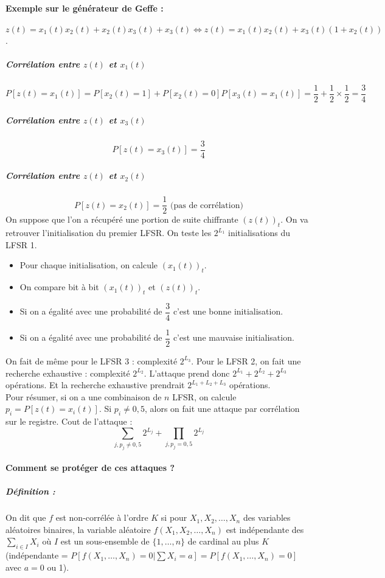 \documentclass[12pt,a4paper]{report}
\begin{document}
\paragraph{Exemple sur le générateur de Geffe :\\}
$z(t) = x_1(t)x_2(t) +x_2(t) x_3(t) + x_3(t) \Leftrightarrow z(t) = x_1(t) x_2(t) +x_3(t)(1+x_2(t))$.
\subparagraph{Corrélation entre $z(t)$ et $x_1(t)$\\}
 $$P[z(t) = x_1(t)]  =  P[x_2(t)=1] + P[x_2(t)=  0]P[x_3(t) = x_1(t)]
                 = \dfrac{1}{2} + \dfrac{1}{2}\times\dfrac{1}{2} 
                 =  \dfrac{3}{4} $$
\subparagraph{Corrélation entre $z(t)$ et $x_3(t)$\\}
$$ P[z(t) = x_3(t)] = \frac{3}{4} $$
\subparagraph{Corrélation entre $z(t)$ et $x_2(t)$\\}
$$ P[z(t) = x_2(t)] = \frac{1}{2} \mbox{ (pas de corrélation)} $$
On suppose que l'on a récupéré une portion de suite chiffrante $(z(t))_t$. On va retrouver l'initialisation du premier LFSR. On teste les $2^{L_1}$ initialisations du LFSR 1.
\begin{itemize}
\item Pour chaque initialisation, on calcule $(x_1(t))_t$.
\item On compare bit à bit $(x_1(t))_t$ et $(z(t))_t$.
\item Si on a égalité avec une probabilité de $\dfrac{3}{4}$ c'est une bonne initialisation.
\item Si on a égalité avec une probabilité de $\dfrac{1}{2}$ c'est une mauvaise initialisation.
\end{itemize}
On fait de même pour le LFSR 3 : complexité $2^{L_3}$. Pour le LFSR 2, on fait une recherche exhaustive : complexité $2^{L_2}$. L'attaque prend donc $2^{L_1}  + 2^{L_2} + 2^{L_3}$ opérations. Et la recherche exhaustive prendrait $2^{L_1+L_2+L_3}$ opérations.\\

Pour résumer, si on a une combinaison de $n$ LFSR, on calcule $p_i = P[z(t) = x_i(t)]$. Si $p_i \neq 0,5$, alors on fait une attaque par corrélation sur le registre. Cout de l'attaque :
$$ \sum_{j,p_j\neq 0,5} 2^{L_j} + \prod_{j,p_j = 0,5}  2^{L_j} $$
\paragraph{Comment se protéger de ces attaques ?}
\subparagraph{Définition :\\}
On dit que $f$ est non-corrélée à l'ordre $K$ si pour $X_1,X_2,\ldots,X_n$ des variables aléatoires binaires, la variable aléatoire $f(X_1,X_2,\ldots,X_n)$ est indépendante des $\displaystyle \sum_{i \in I} X_i$ où $I$ est un sous-ensemble de $\{1,\ldots,n\}$ de cardinal au plus $K$ (indépendante = $P[f(X_1,\ldots,X_n) = 0 | \sum X_i = a] = P[f(X_1,\ldots,X_n) = 0]$ avec $a = 0$ ou 1).\\
\end{document}

